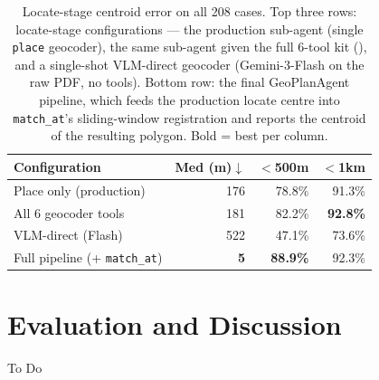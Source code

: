 \documentclass[11pt]{article}
\begin{document}
\begin{table}[h]
\centering
\footnotesize
\setlength{\tabcolsep}{2.5pt}
\begin{tabular}{@{}lrrr@{}}
\toprule
\textbf{Configuration} & \textbf{Med (m)$\downarrow$} & \textbf{$<$500m} & \textbf{$<$1km} \\
\midrule
Place only (production)     & 176 & 78.8\% & 91.3\% \\
All 6 geocoder tools        & 181 & 82.2\% & \textbf{92.8\%} \\
VLM-direct (Flash)          & 522 & 47.1\% & 73.6\% \\
\midrule
Full pipeline (+ \texttt{match\_at}) & \textbf{5} & \textbf{88.9\%} & 92.3\% \\
\bottomrule
\end{tabular}
\caption{Locate-stage centroid error on all 208 cases. Top three rows: locate-stage configurations --- the production sub-agent (single \texttt{place} geocoder), the same sub-agent given the full 6-tool kit (), and a single-shot VLM-direct geocoder (Gemini-3-Flash on the raw PDF, no tools). Bottom row: the final GeoPlanAgent pipeline, which feeds the production locate centre into \texttt{match\_at}'s sliding-window registration and reports the centroid of the resulting polygon. Bold = best per column.}
\label{tab:abl-locate}
\end{table}



\section{Evaluation and Discussion}
To Do




\end{document}
